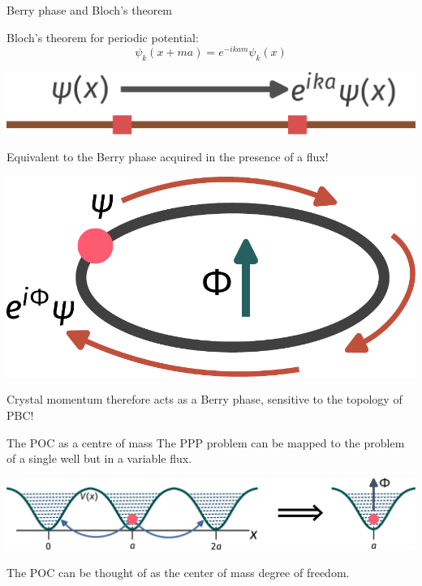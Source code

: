 \documentclass[aspectratio=169]{beamer}
\begin{document}
\begin{frame}{Berry phase and Bloch’s theorem}
\begin{minipage}{0.5\textwidth}
Bloch's theorem for periodic potential:
\[\psi_k(x + ma) = e^{-ikam}\psi_k(x)\]
\end{minipage}
\hspace*{\fill}
\begin{minipage}{0.45\textwidth}
\includegraphics[width=\textwidth]{blochtheorem.pdf}
\end{minipage}

\vspace*{\fill}
\begin{minipage}{0.5\textwidth}
Equivalent to the Berry phase acquired in the presence of a flux!\\[10pt]
\end{minipage}
\hspace*{\fill}
\begin{minipage}{0.45\textwidth}
\includegraphics[width=\textwidth]{berryphase.pdf}
\end{minipage}

\vspace*{\fill}
Crystal momentum therefore acts as a Berry phase, sensitive to the topology of PBC!
\end{frame}

\begin{frame}{The POC as a centre of mass}
The PPP problem can be mapped to the problem \\
of a single well but in a variable flux.

\vspace*{\fill}
\includegraphics[width=\textwidth]{centerofmass.pdf}

\vspace*{\fill}
The POC can be thought of as the \alert{center of mass} degree of freedom.
\end{frame}
\end{document}
